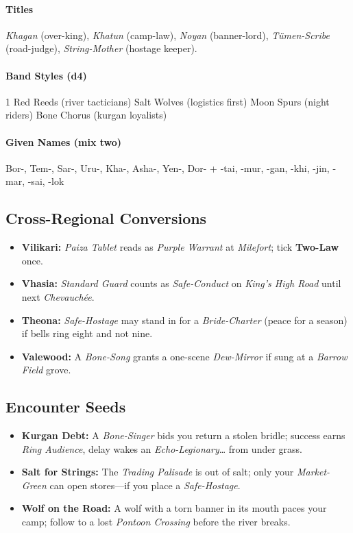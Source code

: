 \paragraph{Titles}
\emph{Khagan} (over-king), \emph{Khatun} (camp-law), \emph{Noyan} (banner-lord), \emph{Tümen-Scribe} (road-judge), \emph{String-Mother} (hostage keeper).

\paragraph{Band Styles (d4)}
1 Red Reeds (river tacticians)  Salt Wolves (logistics first)  Moon Spurs (night riders)  Bone Chorus (kurgan loyalists)

\paragraph{Given Names (mix two)}
Bor-, Tem-, Sar-, Uru-, Kha-, Asha-, Yen-, Dor- + -tai, -mur, -gan, -khi, -jin, -mar, -sai, -lok
\subsection*{Cross-Regional Conversions}

\begin{itemize}
\item \textbf{Vilikari:} \emph{Paiza Tablet} reads as \emph{Purple Warrant} at \emph{Milefort}; tick \textbf{Two-Law} once.
\item \textbf{Vhasia:} \emph{Standard Guard} counts as \emph{Safe-Conduct} on \emph{King’s High Road} until next \emph{Chevauchée}.
\item \textbf{Theona:} \emph{Safe-Hostage} may stand in for a \emph{Bride-Charter} (peace for a season) if bells ring eight and not nine.
\item \textbf{Valewood:} A \emph{Bone-Song} grants a one-scene \emph{Dew-Mirror} if sung at a \emph{Barrow Field} grove.
\end{itemize}
\subsection*{Encounter Seeds}

\begin{itemize}
\item \textbf{Kurgan Debt:} A \emph{Bone-Singer} bids you return a stolen bridle; success earns \emph{Ring Audience}, delay wakes an \emph{Echo-Legionary}… from under grass.
\item \textbf{Salt for Strings:} The \emph{Trading Palisade} is out of salt; only your \emph{Market-Green} can open stores—if you place a \emph{Safe-Hostage}.
\item \textbf{Wolf on the Road:} A wolf with a torn banner in its mouth paces your camp; follow to a lost \emph{Pontoon Crossing} before the river breaks.
\end{itemize}
